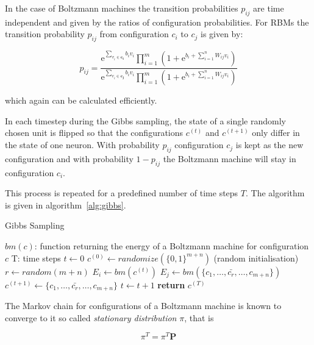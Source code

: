 In the case of Boltzmann machines the transition probabilities $p_{ij}$ are time independent and 
given by the ratios of configuration probabilities. For RBMs the transition probability $p_{ij}$ 
from configuration $c_i$ to $c_j$ is given by:

\begin{equation}
    p_{ij} = \frac{\mathrm{e}^{\sum_{v_i \in \bm{c_i}}b_iv_i}\prod_{i=1}^m(1+\mathrm{e}^{b_i + \sum_{i=1}^nW_{ij}v_i})}{\mathrm{e}^{\sum_{v_i \in \bm{c_j}}b_iv_i}\prod_{i=1}^m(1+\mathrm{e}^{b_i + \sum_{i=1}^nW_{ij}v_i})}
\end{equation}

which again can be calculated efficiently.

In each timestep during the Gibbs sampling, the state of a single randomly chosen unit is flipped
so that the configurations $c^{(t)}$ and $c^{(t+1)}$ only differ in the state of one neuron. With 
probability $p_{ij}$ configuration $c_j$ is kept as the new configuration and with probability
$1-p_{ij}$ the Boltzmann machine will stay in configuration $c_i$.

This process is repeated for a predefined number of time steps $T$. The algorithm is given in 
algorithm~\ref{alg:gibbs}.

\begin{algorithm}
    \label{alg:gibbs}
    \caption{Gibbs Sampling}\label{euclid}
    \begin{algorithmic}[1]
        \Require $bm(c)$: function returning the energy of a Boltzmann machine for configuration $c$
        \Require T: time steps
        \State $t\gets 0$
        \State $c^{(0)} \gets randomize(\{0,1\}^{m+n})$ (random initialisation)
        \Repeat
            \State $r \gets random(m+n)$
            \State $E_i \gets bm(c^{(t)})$
            \State $E_j \gets bm(\{c_1,\dots,\bar{c_r},\dots,c_{m+n}\})$
                \State $c^{(t+1)} \gets \{c_1,\dots,\bar{c_r},\dots,c_{m+n}\}$
            \EndIf
            \State $t\gets t+1$
        \State \textbf{return} $c^{(T)}$
    \end{algorithmic}
\end{algorithm}

The Markov chain for configurations of a Boltzmann machine is known to converge to it so called 
\textit{stationary distribution} $\pi$, that is

\begin{equation}
    \pi^T=\pi^T\bm{P}
\end{equation}

